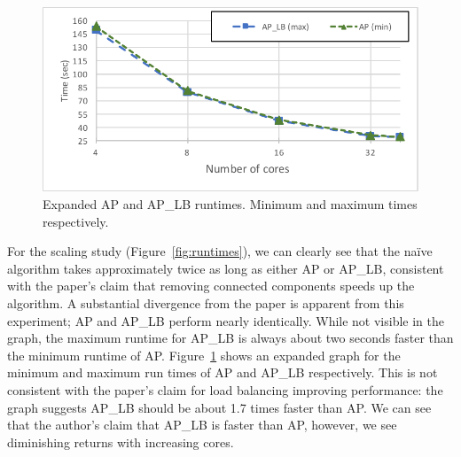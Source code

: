 \documentclass[11pt]{elsarticle}
\begin{document}
\begin{figure}[htp]
\centering
\includegraphics[width=.9\textwidth]{zoomedapaplb2}
\caption{Expanded AP and AP\_LB runtimes. Minimum and maximum times respectively.}
\label{fig:expruntimes}
\end{figure}
For the scaling study (Figure~\ref{fig:runtimes}), we can clearly see that the na{\"i}ve algorithm takes approximately twice as long as either AP or AP\_LB, consistent with the paper's claim that removing connected components speeds up the algorithm. A substantial divergence from the paper is apparent from this experiment; AP and AP\_LB perform nearly identically. While not visible in the graph, the maximum runtime for AP\_LB is always about two seconds faster than the minimum runtime of AP. Figure~\ref{fig:expruntimes} shows an expanded graph for the minimum and maximum run times of AP and AP\_LB respectively. This is not consistent with the paper's claim for load balancing improving performance: the graph suggests AP\_LB should be about 1.7 times faster than AP. We can see that the author's claim that AP\_LB is faster than AP, however, we see diminishing returns with increasing cores.
\end{document}

